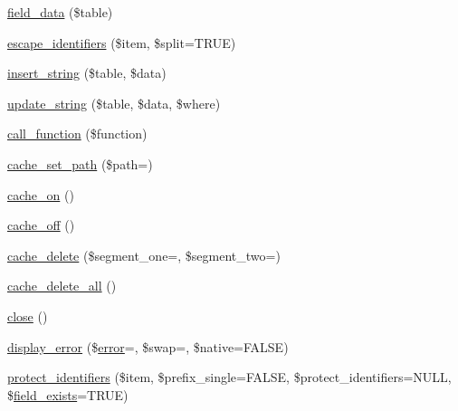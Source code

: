 \begin{DoxyCompactItemize}
\item 
\mbox{\hyperlink{class_c_i___d_b__driver_a90355121e1ed009e0efdbd544ab56efa}{field\+\_\+data}} (\$table)
\item 
\mbox{\hyperlink{class_c_i___d_b__driver_ac4962ebf229973bede312dfd187bc569}{escape\+\_\+identifiers}} (\$item, \$split=T\+R\+UE)
\item 
\mbox{\hyperlink{class_c_i___d_b__driver_ad27720d886add2c9abf9ac48a9ff56d5}{insert\+\_\+string}} (\$table, \$data)
\item 
\mbox{\hyperlink{class_c_i___d_b__driver_af9eb76a74d10fa81e44ecb0dd9bf00d4}{update\+\_\+string}} (\$table, \$data, \$where)
\item 
\mbox{\hyperlink{class_c_i___d_b__driver_af7892f758c89d0e243def92140dbe099}{call\+\_\+function}} (\$function)
\item 
\mbox{\hyperlink{class_c_i___d_b__driver_aec8df4c9b46f8ba06831911d4c3121df}{cache\+\_\+set\+\_\+path}} (\$path=\textquotesingle{}\textquotesingle{})
\item 
\mbox{\hyperlink{class_c_i___d_b__driver_a69ca9bb8bc31400922a565d5c4d64d8d}{cache\+\_\+on}} ()
\item 
\mbox{\hyperlink{class_c_i___d_b__driver_ae577e2be88cb5f0d184f76dc6fd87482}{cache\+\_\+off}} ()
\item 
\mbox{\hyperlink{class_c_i___d_b__driver_a4ccac0d027f9e49091f98d0acbbff13c}{cache\+\_\+delete}} (\$segment\+\_\+one=\textquotesingle{}\textquotesingle{}, \$segment\+\_\+two=\textquotesingle{}\textquotesingle{})
\item 
\mbox{\hyperlink{class_c_i___d_b__driver_a6e74f4d3938c78892f490b4f11faf318}{cache\+\_\+delete\+\_\+all}} ()
\item 
\mbox{\hyperlink{class_c_i___d_b__driver_aa69c8bf1f1dcf4e72552efff1fe3e87e}{close}} ()
\item 
\mbox{\hyperlink{class_c_i___d_b__driver_a1ca178ae41a8c6c0e461dfb2653cfd81}{display\+\_\+error}} (\$\mbox{\hyperlink{class_c_i___d_b__driver_a43b8d30b879d4f09ceb059b02af2bc02}{error}}=\textquotesingle{}\textquotesingle{}, \$swap=\textquotesingle{}\textquotesingle{}, \$native=F\+A\+L\+SE)
\item 
\mbox{\hyperlink{class_c_i___d_b__driver_ade8e28ac268bbe2f985c5359bc949f21}{protect\+\_\+identifiers}} (\$item, \$prefix\+\_\+single=F\+A\+L\+SE, \$protect\+\_\+identifiers=N\+U\+LL, \$\mbox{\hyperlink{class_c_i___d_b__driver_ad349ffee1eed59a2eb8f0f1d3033764f}{field\+\_\+exists}}=T\+R\+UE)
\end{DoxyCompactItemize}
